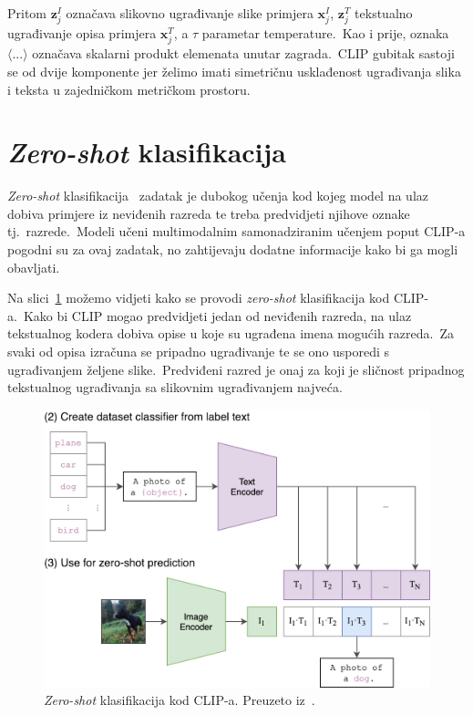 \documentclass[times, utf8, seminar, numeric]{fer}
\begin{document}
Pritom $\bm{z}_{j}^I$ označava slikovno ugrađivanje slike primjera $\bm{x}_{j}^I$, $\bm{z}_{j}^T$ tekstualno ugrađivanje opisa primjera $\bm{x}_{j}^T$, a $\tau$ parametar temperature.\ 
Kao i prije, oznaka $\langle ... \rangle$ označava skalarni produkt elemenata unutar zagrada.\ 
CLIP gubitak sastoji se od dvije komponente jer želimo imati simetričnu usklađenost ugrađivanja slika i teksta u zajedničkom metričkom prostoru.\

\section{\textit{Zero-shot} klasifikacija}

\textit{Zero-shot} klasifikacija~\cite{xian2018zero} zadatak je dubokog učenja kod kojeg model na ulaz dobiva primjere iz neviđenih razreda te treba predvidjeti njihove oznake tj.\ razrede.\ 
Modeli učeni multimodalnim samonadziranim učenjem poput CLIP-a pogodni su za ovaj zadatak, no zahtijevaju dodatne informacije kako bi ga mogli obavljati.\

Na slici~\ref{fig:CLIP_zero_shot} možemo vidjeti kako se provodi \textit{zero-shot} klasifikacija kod CLIP-a.\ 
Kako bi CLIP mogao predvidjeti jedan od neviđenih razreda, na ulaz tekstualnog kodera dobiva opise u koje su ugrađena imena mogućih razreda.\ 
Za svaki od opisa izračuna se pripadno ugrađivanje te se ono usporedi s ugrađivanjem željene slike.\ Predviđeni razred je onaj za koji je sličnost pripadnog tekstualnog ugrađivanja sa slikovnim ugrađivanjem najveća.\

\begin{figure}[h]
    \centering
    \includegraphics[scale=0.5]{./Slike/CLIP_zero_shot.png}
    \caption{\textit{Zero-shot} klasifikacija kod CLIP-a. Preuzeto iz~\cite{radford2021learning}.}
    \label{fig:CLIP_zero_shot}
\end{figure}
\end{document}
